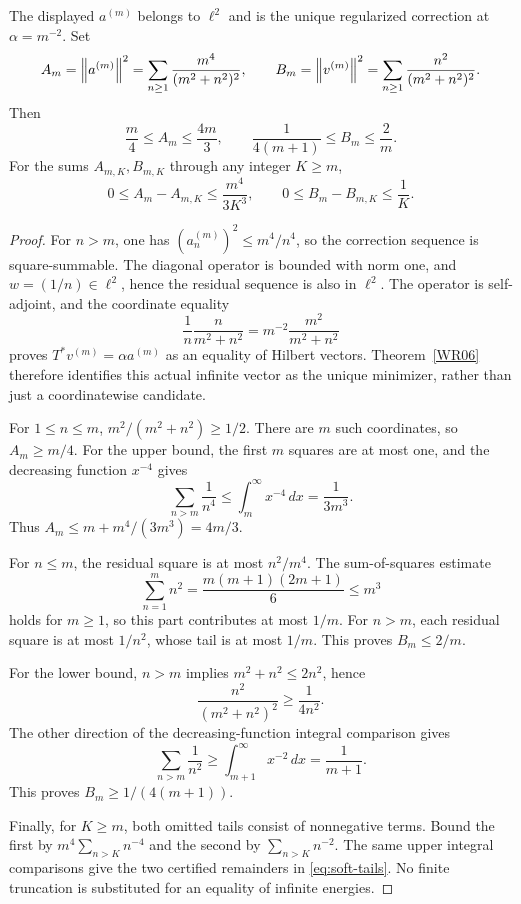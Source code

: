 \begin{proposition}\label{WR10}
The displayed $a^{(m)}$ belongs to $\ell^2$ and is the unique regularized correction at $\alpha=m^{-2}$. Set
\[
 A_m=\left\lVert a^{(m)}\right\rVert^2=\sum_{n\ge1}\frac{m^4}{(m^2+n^2)^2},\qquad
 B_m=\left\lVert v^{(m)}\right\rVert^2=\sum_{n\ge1}\frac{n^2}{(m^2+n^2)^2}.
\]
Then
\begin{equation}\label{eq:soft-bounds}
 \frac m4\le A_m\le\frac{4m}{3},\qquad
 \frac1{4(m+1)}\le B_m\le\frac2m.
\end{equation}
For the sums $A_{m,K},B_{m,K}$ through any integer $K\ge m$,
\begin{equation}\label{eq:soft-tails}
 0\le A_m-A_{m,K}\le\frac{m^4}{3K^3},\qquad
 0\le B_m-B_{m,K}\le\frac1K.
\end{equation}
\end{proposition}
\begin{proof}
For $n>m$, one has $(a_n^{(m)})^2\le m^4/n^4$, so the correction sequence is square-summable. The diagonal operator is bounded with norm one, and $w=(1/n)\in\ell^2$, hence the residual sequence is also in $\ell^2$. The operator is self-adjoint, and the coordinate equality
\[
 \frac1n\frac{n}{m^2+n^2}
 =m^{-2}\frac{m^2}{m^2+n^2}
\]
proves $T^*v^{(m)}=\alpha a^{(m)}$ as an equality of Hilbert vectors. Theorem~\ref{WR06} therefore identifies this actual infinite vector as the unique minimizer, rather than just a coordinatewise candidate.

For $1\le n\le m$, $m^2/(m^2+n^2)\ge1/2$. There are $m$ such coordinates, so $A_m\ge m/4$. For the upper bound, the first $m$ squares are at most one, and the decreasing function $x^{-4}$ gives
\[
 \sum_{n>m}\frac1{n^4}\le\int_m^\infty x^{-4}\,dx=\frac1{3m^3}.
\]
Thus $A_m\le m+m^4/(3m^3)=4m/3$.

For $n\le m$, the residual square is at most $n^2/m^4$. The sum-of-squares estimate
\[
 \sum_{n=1}^m n^2=\frac{m(m+1)(2m+1)}6\le m^3
\]
holds for $m\ge1$, so this part contributes at most $1/m$. For $n>m$, each residual square is at most $1/n^2$, whose tail is at most $1/m$. This proves $B_m\le2/m$.

For the lower bound, $n>m$ implies $m^2+n^2\le2n^2$, hence
\[
 \frac{n^2}{(m^2+n^2)^2}\ge\frac1{4n^2}.
\]
The other direction of the decreasing-function integral comparison gives
\[
 \sum_{n>m}\frac1{n^2}\ge\int_{m+1}^\infty x^{-2}\,dx=\frac1{m+1}.
\]
This proves $B_m\ge1/(4(m+1))$.

Finally, for $K\ge m$, both omitted tails consist of nonnegative terms. Bound the first by $m^4\sum_{n>K}n^{-4}$ and the second by $\sum_{n>K}n^{-2}$. The same upper integral comparisons give the two certified remainders in \eqref{eq:soft-tails}. No finite truncation is substituted for an equality of infinite energies.
\end{proof}

